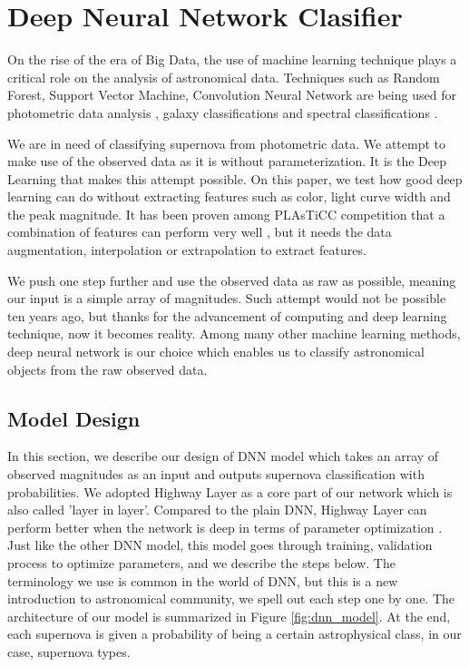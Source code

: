 \documentclass[useamsfonts]{pasj01}
\begin{document}
\section{Deep Neural Network Clasifier}
On the rise of the era of Big Data, the use of machine learning technique plays a critical role on the analysis of astronomical data.  Techniques such as Random Forest, Support Vector Machine, Convolution Neural Network are being used for photometric data analysis \citep{pasquet19a}, galaxy classifications \citep{hausen19a} and spectral 
classifications \citep{garciadias18a,muthukrishna19c,sharma20a}.

We are in need of classifying supernova from photometric data.  We attempt to make use of the observed data as it is without parameterization.  It is the Deep Learning that makes this attempt possible.   On this paper, we test how good deep learning can do without extracting features such as color, light curve width and the peak magnitude.  It has been proven among PLAsTiCC competition that a combination of features can perform very well \citep{boone19a}, but it needs the data augmentation, interpolation or extrapolation to extract features.

We push one step further and use the observed data as raw as possible, meaning our input is a simple array of magnitudes.  Such attempt would not be possible ten years ago, but thanks for the advancement of computing and deep learning technique, now it becomes reality.  Among many other machine learning methods, deep neural network is our choice which enables us to classify astronomical objects from the raw observed data. 

\subsection{Model Design}
\label{sec:model} %
In this section, we describe our design of DNN model which takes an array of observed magnitudes as an input and outputs supernova classification with probabilities.  We adopted Highway Layer \citep{srivastava15a} as a core part of our network which is also called 'layer in layer'.  Compared to the plain DNN, Highway Layer can perform better when the network is deep in terms of parameter optimization \citep{srivastava15b}.   
Just like the other DNN model, this model goes through training, validation process to optimize parameters, and we describe the steps below.  The terminology we use is common in the world of DNN, but this is a new introduction to astronomical community, we spell out each step one by one.  The architecture of our model is summarized in Figure \ref{fig:dnn_model}.
At the end, each supernova is given a probability of being a certain astrophysical class, in our case, supernova types. 
\end{document}
